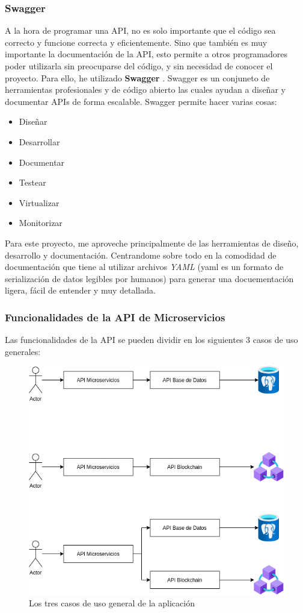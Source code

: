 \subsubsection{Swagger}
A la hora de programar una API, no es solo importante que el código sea correcto y funcione correcta y eficientemente. Sino que también es muy importante la documentación de la API, esto permite a otros programadores poder utilizarla sin preocuparse del código, y sin necesidad de conocer el proyecto. Para ello, he utilizado \textbf{Swagger} \cite{swagger}. Swagger es un conjuneto de herramientas profesionales y de código abierto las cuales ayudan a diseñar y documentar APIs de forma escalable. Swagger permite hacer varias cosas:
\begin{itemize}
\item Diseñar
\item Desarrollar
\item Documentar
\item Testear
\item Virtualizar
\item Monitorizar
\end{itemize}

Para este proyecto, me aproveche principalmente de las herramientas de diseño, desarrollo y documentación. Centrandome sobre todo en la comodidad de documentación que tiene al utilizar archivos \emph{YAML} (yaml es un formato de serialización de datos legibles por humanos) para generar una docuementación ligera, fácil de entender y muy detallada. 

\subsubsection{Funcionalidades de la API de Microservicios}
Las funcionalidades de la API se pueden dividir en los siguientes 3 casos de uso generales:

\begin{figure}[h!]
  \centering
  \includegraphics[width=0.6\linewidth]{figs/Desarrollo/UML}
  \caption[Arquitectura]{Los tres casos de uso general de la aplicación}
  \label{fig:casosUso}
\end{figure}

